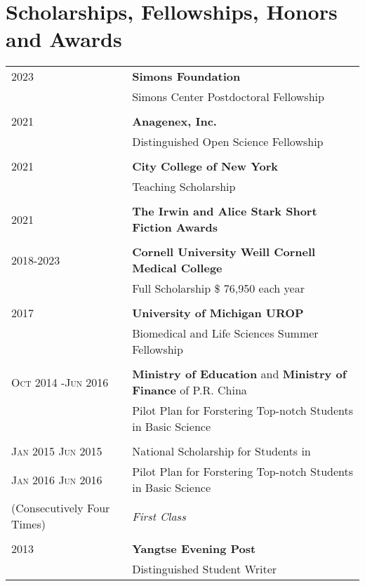 \documentclass[letterpaper,10pt]{article}
\begin{document}
\section{Scholarships, Fellowships, Honors and Awards}
\begin{longtable}{p{} p{} }
2023 & \textbf{Simons Foundation}\\
& Simons Center Postdoctoral Fellowship \\\\

2021 & \textbf{Anagenex, Inc.}\\
& Distinguished Open Science Fellowship \\\\

2021 & \textbf{City College of New York}\\
& Teaching Scholarship \\\\

2021 & \textbf{The Irwin and Alice Stark Short Fiction Awards}\\\\

2018-2023 & \textbf{Cornell University Weill Cornell Medical College}\\
     & Full Scholarship \$ 76,950 each year \\\\

\textsc{2017} & \textbf{University of Michigan UROP} \\ &  Biomedical and Life Sciences Summer Fellowship\\\\

\textsc{Oct 2014 -Jun 2016} & \textbf{Ministry of Education} and  \textbf{Ministry of Finance} of P.R. China \\ &Pilot Plan for Forstering Top-notch Students in Basic Science \\\\
 \textsc{Jan} 2015 \textsc{Jun} 2015 & National Scholarship for Students in \\ \textsc{Jan} 2016 \textsc{Jun} 2016 & Pilot Plan for Forstering Top-notch Students in Basic Science \\ \footnotesize(Consecutively Four Times) & \emph{First Class}\\\\
 \textsc 2013 &\textbf{Yangtse Evening Post} \\& Distinguished Student Writer\\
\end{longtable}
\end{document}
